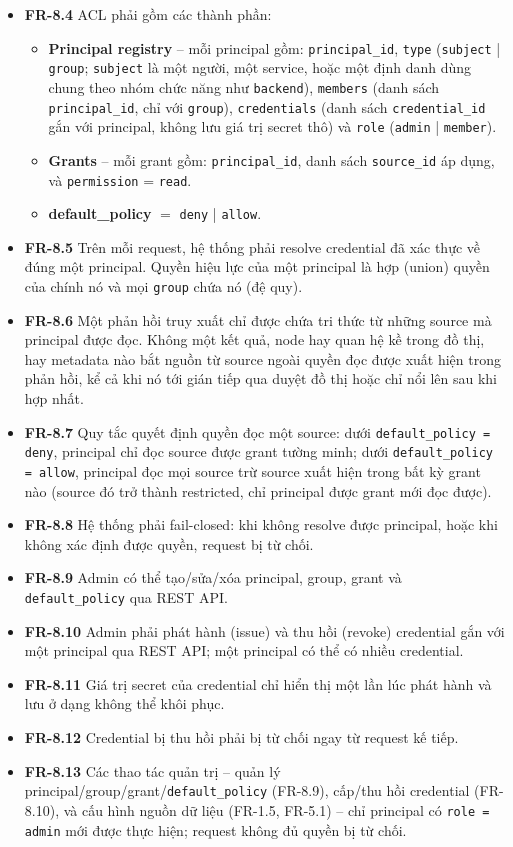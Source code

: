\begin{itemize}
  \item \textbf{FR-8.4} ACL phải gồm các thành phần:
  \begin{itemize}
  \item \textbf{Principal registry} -- mỗi principal gồm: \texttt{principal\_id}, \texttt{type} (\texttt{subject} | \texttt{group}; \texttt{subject} là một người, một service, hoặc một định danh dùng chung theo nhóm chức năng như \texttt{backend}), \texttt{members} (danh sách \texttt{principal\_id}, chỉ với \texttt{group}), \texttt{credentials} (danh sách \texttt{credential\_id} gắn với principal, không lưu giá trị secret thô) và \texttt{role} (\texttt{admin} | \texttt{member}).
  \item \textbf{Grants} -- mỗi grant gồm: \texttt{principal\_id}, danh sách \texttt{source\_id} áp dụng, và \texttt{permission} = \texttt{read}.
  \item \textbf{default\_policy} $=$ \texttt{deny} | \texttt{allow}.
  \end{itemize}
  \item \textbf{FR-8.5} Trên mỗi request, hệ thống phải resolve credential đã xác thực về đúng một principal. Quyền hiệu lực của một principal là hợp (union) quyền của chính nó và mọi \texttt{group} chứa nó (đệ quy).
  \item \textbf{FR-8.6} Một phản hồi truy xuất chỉ được chứa tri thức từ những source mà principal được đọc. Không một kết quả, node hay quan hệ kề trong đồ thị, hay metadata nào bắt nguồn từ source ngoài quyền đọc được xuất hiện trong phản hồi, kể cả khi nó tới gián tiếp qua duyệt đồ thị hoặc chỉ nổi lên sau khi hợp nhất.
  \item \textbf{FR-8.7} Quy tắc quyết định quyền đọc một source: dưới \texttt{default\_policy = deny}, principal chỉ đọc source được grant tường minh; dưới \texttt{default\_policy = allow}, principal đọc mọi source trừ source xuất hiện trong bất kỳ grant nào (source đó trở thành restricted, chỉ principal được grant mới đọc được).
  \item \textbf{FR-8.8} Hệ thống phải fail-closed: khi không resolve được principal, hoặc khi không xác định được quyền, request bị từ chối.
  \item \textbf{FR-8.9} Admin có thể tạo/sửa/xóa principal, group, grant và \texttt{default\_policy} qua REST API.
  \item \textbf{FR-8.10} Admin phải phát hành (issue) và thu hồi (revoke) credential gắn với một principal qua REST API; một principal có thể có nhiều credential.
  \item \textbf{FR-8.11} Giá trị secret của credential chỉ hiển thị một lần lúc phát hành và lưu ở dạng không thể khôi phục.
  \item \textbf{FR-8.12} Credential bị thu hồi phải bị từ chối ngay từ request kế tiếp.
  \item \textbf{FR-8.13} Các thao tác quản trị -- quản lý principal/group/grant/\texttt{default\_policy} (FR-8.9), cấp/thu hồi credential (FR-8.10), và cấu hình nguồn dữ liệu (FR-1.5, FR-5.1) -- chỉ principal có \texttt{role = admin} mới được thực hiện; request không đủ quyền bị từ chối.
\end{itemize}

